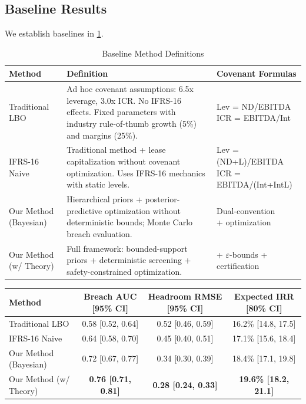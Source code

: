 \documentclass[11pt,a4paper]{article}
\theoremstyle{plain}
\theoremstyle{definition}
\newcommand{\cref}[1]{\ref{#1}}
\begin{document}
\subsection{Baseline Results}

We establish baselines in \cref{tab:baseline_definitions}.

\begin{table}[h]
\centering
\caption{Baseline Method Definitions}
\label{tab:baseline_definitions}
\begin{tabular}{lp{8cm}p{3cm}}
\toprule
Method & Definition & Covenant Formulas \\
\midrule
Traditional LBO & Ad hoc covenant assumptions: 6.5x leverage, 3.0x ICR. No IFRS-16 effects. Fixed parameters with industry rule-of-thumb growth (5\%) and margins (25\%). & \footnotesize{Lev = ND/EBITDA \\ ICR = EBITDA/Int} \\
IFRS-16 Naive & Traditional method + lease capitalization without covenant optimization. Uses IFRS-16 mechanics with static levels. & \footnotesize{Lev = (ND+L)/EBITDA \\ ICR = EBITDA/(Int+IntL)} \\
Our Method (Bayesian) & Hierarchical priors + posterior-predictive optimization without deterministic bounds; Monte Carlo breach evaluation. & \footnotesize{Dual-convention \\ + optimization} \\
Our Method (w/ Theory) & Full framework: bounded-support priors + deterministic screening + safety-constrained optimization. & \footnotesize{+ $\varepsilon$-bounds \\ + certification} \\
\bottomrule
\end{tabular}
\end{table}

\begin{center}
\begin{tabular}{lccc}
\toprule
Method & Breach AUC [95\% CI] & Headroom RMSE [95\% CI] & Expected IRR [80\% CI] \\
\midrule
Traditional LBO & 0.58 [0.52, 0.64] & 0.52 [0.46, 0.59] & 16.2\% [14.8, 17.5] \\
IFRS-16 Naive & 0.64 [0.58, 0.70] & 0.45 [0.40, 0.51] & 17.1\% [15.6, 18.4] \\
Our Method (Bayesian) & 0.72 [0.67, 0.77] & 0.34 [0.30, 0.39] & 18.4\% [17.1, 19.8] \\
Our Method (w/ Theory) & \textbf{0.76 [0.71, 0.81]} & \textbf{0.28 [0.24, 0.33]} & \textbf{19.6\% [18.2, 21.1]} \\
\bottomrule
\end{tabular}
\end{center}
\end{document}
